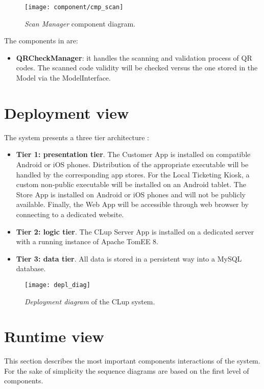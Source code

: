 \begin{figure}[H]
	\centering
	\texttt{[image: component/cmp\_scan]}
	\caption{\textit{Scan Manager} component diagram.}
	\label{fig:cmp_scan}
\end{figure}

The components in  are:
\begin{itemize}
	\item \textbf{QRCheckManager}: it handles the scanning and validation process of QR codes. The scanned code validity will be checked versus the one stored in the Model via the ModelInterface.
\end{itemize}
\clearpage

\section{Deployment view}
The system presents a three tier architecture :
\begin{itemize}
	\item \textbf{Tier 1: presentation tier}. The Customer App is installed on compatible Android or iOS phones. Distribution of the appropriate executable will be handled by the corresponding app stores. For the Local Ticketing Kiosk, a custom non-public executable will be installed on an Android tablet.\newline
	The Store App is installed on Android or iOS phones and will not be publicly available.\newline
	Finally, the Web App will be accessible through web browser by connecting to a dedicated website.
	
	\item \textbf{Tier 2: logic tier}. The CLup Server App is installed on a dedicated server with a running instance of Apache TomEE 8.
	
	\item \textbf{Tier 3: data tier}. All data is stored in a persistent way into a MySQL database.
\end{itemize}


\begin{figure}[H]
	\centering
	\texttt{[image: depl\_diag]}
	\caption{\textit{Deployment diagram} of the CLup system.}
	\label{fig:depl_diag}
\end{figure}
\clearpage

\section{Runtime view}
This section describes the most important components interactions of the system.\newline
For the sake of simplicity the sequence diagrams are based on the first level of components. 
